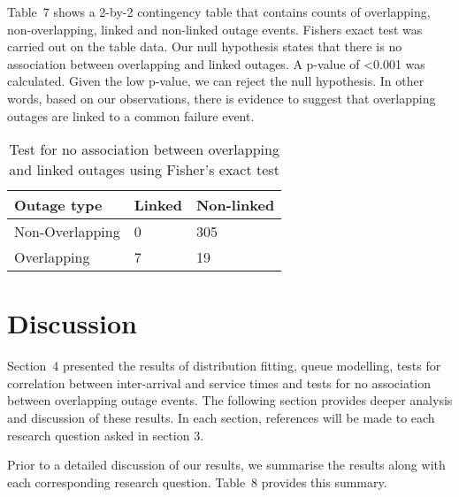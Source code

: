 \documentclass[5p]{elsarticle}
\begin{document}
Table~7 shows a 2-by-2 contingency table that contains counts of overlapping, non-overlapping, linked and non-linked outage events. Fishers exact test was carried out on the table data. Our null hypothesis states that there is no association between overlapping and linked outages. A p-value of \textless 0.001 was calculated. Given the low p-value, we can reject the null hypothesis. In other words, based on our observations, there is evidence to suggest that overlapping outages are linked to a common failure event.

\begin {table}
\caption {Test for no association between overlapping and linked outages using Fisher's exact test} 
\begin{center}
\begin{tabular}{p{2.7cm} |  p{1.1cm} | p{2cm}} \hline \bf{Outage type} & \bf{Linked}  & \bf{Non-linked}
\\ \hline Non-Overlapping  & 0 & 305
\\ Overlapping & 7 & 19
\\ \hline
\end{tabular}
\end{center}
\end{table}

\section{Discussion}

Section~4 presented the results of distribution fitting, queue modelling, tests for correlation between inter-arrival and service times and tests for no association between overlapping outage events. The following section provides deeper analysis and discussion of these results. In each section, references will be made to each research question asked in section 3. 

Prior to a detailed discussion of our results, we summarise the results along with each corresponding research question. Table~8 provides this summary.
\end{document}
